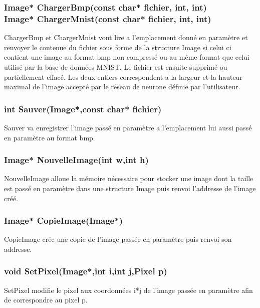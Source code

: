 \documentclass{article}
\begin{document}
		\subsubsection{\textcolor{myblue}{\textbf{Image*}} ChargerBmp(\textcolor{myblue}{\textbf{const char*}} fichier,  \textcolor{myblue}{\textbf{int}},  \textcolor{myblue}{\textbf{int}})\\
		\textcolor{myblue}{\textbf{Image*}} ChargerMnist(\textcolor{myblue}{\textbf{const char*}} fichier,  \textcolor{myblue}{\textbf{int}},  \textcolor{myblue}{\textbf{int}})}
		ChargerBmp et ChargerMnist vont lire a l'emplacement donné en paramètre et renvoyer le contenue du fichier sous forme de la structure Image si celui ci contient une image au format bmp non compressé ou au même format que celui utilisé par la base de données MNIST. Le fichier est ensuite supprimé ou partiellement effacé. Les deux entiers correspondent a la largeur et la hauteur maximal de l'image accepté par le réseau de neurone définie par l'utilisateur.
		
		\subsubsection{\textcolor{myblue}{\textbf{int}} Sauver(\textcolor{myblue}{\textbf{Image*}},\textcolor{myblue}{\textbf{const char*}} fichier)}
		Sauver va enregistrer l'image passé en paramètre a l'emplacement lui aussi passé en paramètre au format bmp.
		
		\subsubsection{\textcolor{myblue}{\textbf{Image*}} NouvelleImage(\textcolor{myblue}{\textbf{int}} w,\textcolor{myblue}{\textbf{int}} h)}
		NouvelleImage alloue la mémoire nécessaire pour stocker une image dont la taille est passé en paramètre dans une structure Image puis renvoi l'addresse de l'image créé.
		
		\subsubsection{\textcolor{myblue}{\textbf{Image*}} CopieImage(\textcolor{myblue}{\textbf{Image*}})}
		CopieImage crée une copie de l'image passée en paramètre puis renvoi son addresse.
		
		\subsubsection{\textcolor{myblue}{\textbf{void}} SetPixel(\textcolor{myblue}{\textbf{Image*}},\textcolor{myblue}{\textbf{int}} i,\textcolor{myblue}{\textbf{int}} j,\textcolor{myblue}{\textbf{Pixel}} p)}
			SetPixel modifie le pixel aux coordonnées i*j de l'image passée en paramètre afin de correspondre au pixel p.
		
\end{document}
